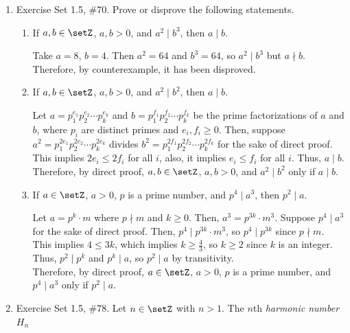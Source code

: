 \begin{enumerate}
\newpage
\item Exercise Set 1.5, \#70.
Prove or disprove the following statements.
\begin{enumerate}
  \item If $a,b \in \setZ$, $a,b>0$, and $a^2 \mid b^3$, then $a \mid b$.
  \begin{subdisprove}
    Take $a=8$, $b=4$. Then $a^2=64$ and $b^3=64$, so $a^2\mid b^3$ but $a\nmid b$.\vspace*{10px}\\
    Therefore, by counterexample, it has been disproved.
  \end{subdisprove}
  \item If $a,b \in \setZ$, $a,b>0$, and $a^2 \mid b^2$, then $a \mid b$.
  \begin{subprove}
    Let $a = p_1^{e_1} p_2^{e_2} \cdots p_k^{e_k}$ and $b = p_1^{f_1} p_2^{f_2} \cdots p_k^{f_k}$ 
    be the prime factorizations of $a$ and $b$, where $p_i$ are distinct primes and 
    $e_i, f_i \geq 0$. Then, suppose $a^2 = p_1^{2e_1} p_2^{2e_2} \cdots p_k^{2e_k}$ divides 
    $b^2 = p_1^{2f_1} p_2^{2f_2} \cdots p_k^{2f_k}$ 
    for the sake of direct proof. This implies $2e_i \leq 2f_i$ for all $i$, also, it implies 
    $e_i \leq f_i$ for all $i$. Thus, $a \mid b$.\vspace*{10px}\\
    Therefore, by direct proof, $a,b \in \setZ$, $a,b>0$, and $a^2 \mid b^2$ only if $a \mid b$.
  \end{subprove}
  \item If $a \in \setZ$, $a>0$, $p$ is a prime number, and $p^4 \mid a^3$, then $p^2 \mid a$.   
  \begin{subprove}
    Let $a = p^{k} \cdot m$ where $p \nmid m$ and $k \geq 0$. 
    Then, $a^3 = p^{3k} \cdot m^3$. Suppose $p^4 \mid a^3$ for the sake of direct proof. 
    Then, $p^4 \mid p^{3k} \cdot m^3$, so $p^4 \mid p^{3k}$ since $p \nmid m$.
    This implies $4 \leq 3k$, which implies $k \geq \frac{4}{3}$, so $k \geq 2$ since $k$ is an integer.
    Thus, $p^2 \mid p^k$ and $p^k \mid a$, so $p^2 \mid a$ by transitivity.\vspace*{10px}\\
    Therefore, by direct proof, $a \in \setZ$, $a>0$, $p$ is a prime number, and $p^4 \mid a^3$ only if $p^2 \mid a$.   
  \end{subprove}
\end{enumerate}
\item Exercise Set 1.5, \#78. 
Let $n \in \setZ$ with $n>1$. The $n$th \emph{harmonic number} $H_n$

\end{enumerate}
